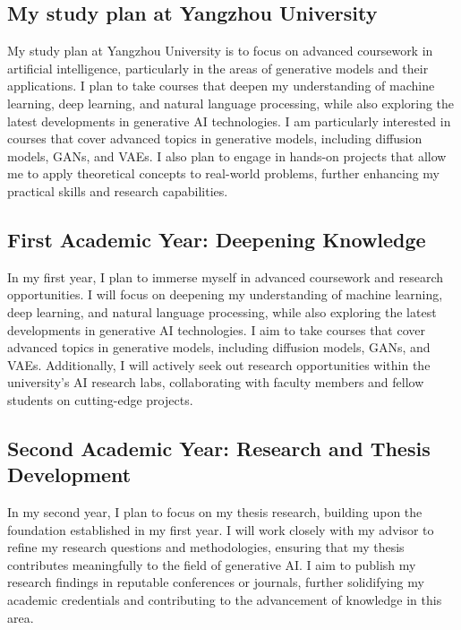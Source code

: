 \documentclass[12pt,a4paper]{article}
\begin{document}
\begin{CJK*}{UTF8}{gbsn}
\section*{My study plan at Yangzhou University}
My study plan at Yangzhou University is to focus on advanced coursework in artificial intelligence, particularly in the areas of generative models and their applications. I plan to take courses that deepen my understanding of machine learning, deep learning, and natural language processing, while also exploring the latest developments in generative AI technologies.
I am particularly interested in courses that cover advanced topics in generative models, including diffusion models, GANs, and VAEs. I also plan to engage in hands-on projects that allow me to apply theoretical concepts to real-world problems, further enhancing my practical skills and research capabilities.

\subsection*{First Academic Year: Deepening Knowledge}
In my first year, I plan to immerse myself in advanced coursework and research opportunities. I will focus on deepening my understanding of machine learning, deep learning, and natural language processing, while also exploring the latest developments in generative AI technologies. I aim to take courses that cover advanced topics in generative models, including diffusion models, GANs, and VAEs. Additionally, I will actively seek out research opportunities within the university's AI research labs, collaborating with faculty members and fellow students on cutting-edge projects.

\subsection*{Second Academic Year: Research and Thesis Development }
In my second year, I plan to focus on my thesis research, building upon the foundation established in my first year. I will work closely with my advisor to refine my research questions and methodologies, ensuring that my thesis contributes meaningfully to the field of generative AI. I aim to publish my research findings in reputable conferences or journals, further solidifying my academic credentials and contributing to the advancement of knowledge in this area.\newline


\end{CJK*}
\end{document}
